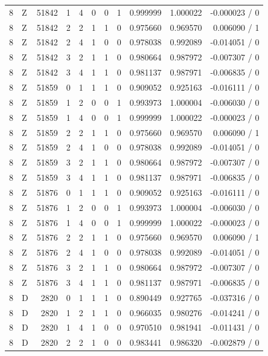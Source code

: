 \begin{longtable}{@{}rlrrlrrrrrr@{}}
8 & Z & 51842 & 1 & 4 & 0 & 0 & 1 & 0.999999 & 1.000022 & -0.000023 / 0 \\
8 & Z & 51842 & 2 & 2 & 1 & 1 & 0 & 0.975660 & 0.969570 & 0.006090 / 1 \\
8 & Z & 51842 & 2 & 4 & 1 & 0 & 0 & 0.978038 & 0.992089 & -0.014051 / 0 \\
8 & Z & 51842 & 3 & 2 & 1 & 1 & 0 & 0.980664 & 0.987972 & -0.007307 / 0 \\
8 & Z & 51842 & 3 & 4 & 1 & 1 & 0 & 0.981137 & 0.987971 & -0.006835 / 0 \\
8 & Z & 51859 & 0 & 1 & 1 & 1 & 0 & 0.909052 & 0.925163 & -0.016111 / 0 \\
8 & Z & 51859 & 1 & 2 & 0 & 0 & 1 & 0.993973 & 1.000004 & -0.006030 / 0 \\
8 & Z & 51859 & 1 & 4 & 0 & 0 & 1 & 0.999999 & 1.000022 & -0.000023 / 0 \\
8 & Z & 51859 & 2 & 2 & 1 & 1 & 0 & 0.975660 & 0.969570 & 0.006090 / 1 \\
8 & Z & 51859 & 2 & 4 & 1 & 0 & 0 & 0.978038 & 0.992089 & -0.014051 / 0 \\
8 & Z & 51859 & 3 & 2 & 1 & 1 & 0 & 0.980664 & 0.987972 & -0.007307 / 0 \\
8 & Z & 51859 & 3 & 4 & 1 & 1 & 0 & 0.981137 & 0.987971 & -0.006835 / 0 \\
8 & Z & 51876 & 0 & 1 & 1 & 1 & 0 & 0.909052 & 0.925163 & -0.016111 / 0 \\
8 & Z & 51876 & 1 & 2 & 0 & 0 & 1 & 0.993973 & 1.000004 & -0.006030 / 0 \\
8 & Z & 51876 & 1 & 4 & 0 & 0 & 1 & 0.999999 & 1.000022 & -0.000023 / 0 \\
8 & Z & 51876 & 2 & 2 & 1 & 1 & 0 & 0.975660 & 0.969570 & 0.006090 / 1 \\
8 & Z & 51876 & 2 & 4 & 1 & 0 & 0 & 0.978038 & 0.992089 & -0.014051 / 0 \\
8 & Z & 51876 & 3 & 2 & 1 & 1 & 0 & 0.980664 & 0.987972 & -0.007307 / 0 \\
8 & Z & 51876 & 3 & 4 & 1 & 1 & 0 & 0.981137 & 0.987971 & -0.006835 / 0 \\
8 & D & 2820 & 0 & 1 & 1 & 1 & 0 & 0.890449 & 0.927765 & -0.037316 / 0 \\
8 & D & 2820 & 1 & 2 & 1 & 1 & 0 & 0.966035 & 0.980276 & -0.014241 / 0 \\
8 & D & 2820 & 1 & 4 & 1 & 0 & 0 & 0.970510 & 0.981941 & -0.011431 / 0 \\
8 & D & 2820 & 2 & 2 & 1 & 0 & 0 & 0.983441 & 0.986320 & -0.002879 / 0 \\

\end{longtable}
